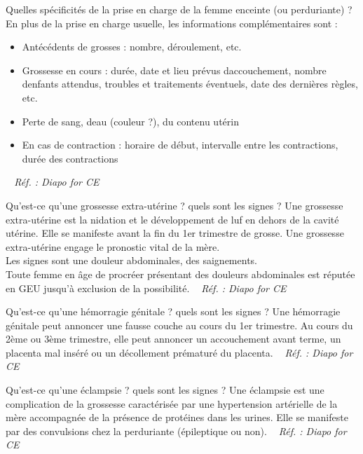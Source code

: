 \documentclass[grid,avery5371,landscape]{flashcards}
\makeatletter
\newcounter{nocarte}
\newcommand{\categ}[1]{%
  \def\@categ{#1}%
  \setcounter{nocarte}{0}%
}
\newcommand{\source}[1]{%
  \medskip
  \itshape%
   ~ \hfill Réf. : #1}
\makeatother
\begin{document}
\color[HTML]{01DF01}
\categ{CE-CP-REG}
\begin{flashcard}[CAT]{
 Quelles spécificités de la prise en charge de la femme enceinte (ou perduriante) ?   }
  En plus de la prise en charge usuelle, les informations complémentaires sont :
    \begin{itemize}
        \item Antécédents de grosses : nombre, déroulement, etc.
        \item Grossesse en cours : durée, date et lieu prévus daccouchement, nombre denfants attendus, troubles et traitements éventuels, date des dernières règles, etc.
        \item Perte de sang, deau (couleur ?), du contenu utérin
        \item En cas de contraction : horaire de début, intervalle entre les contractions, durée des contractions
    \end{itemize}
  \source{Diapo for CE }
\end{flashcard}


\color[HTML]{01DF01}
\categ{CE-CP-REG}
\begin{flashcard}[bilan]{
 Qu'est-ce qu'une grossesse extra-utérine ? quels sont les signes ?   }
  Une grossesse extra-utérine est la nidation et le développement de luf en dehors de la cavité utérine. Elle se manifeste avant la fin du 1er trimestre de grosse. Une grossesse extra-utérine engage le pronostic vital de la mère. \\
    Les signes sont une douleur abdominales, des saignements. \\
    Toute femme en âge de procréer présentant des douleurs abdominales est réputée en GEU jusqu'à exclusion de la possibilité.
  \source{Diapo for CE }
\end{flashcard}


\color[HTML]{01DF01}
\categ{CE-CP-REG}
\begin{flashcard}[bilan]{
 Qu'est-ce qu'une hémorragie génitale ? quels sont les signes ?   }
  Une hémorragie génitale peut annoncer une fausse couche au cours du 1er trimestre. Au cours du 2ème ou 3ème trimestre, elle peut annoncer un accouchement avant terme, un placenta mal inséré ou un décollement prématuré du placenta.
  \source{Diapo for CE }
\end{flashcard}


\color[HTML]{01DF01}
\categ{CE-CP-REG}
\begin{flashcard}[bilan]{
 Qu'est-ce qu'une éclampsie ? quels sont les signes ?   }
  Une éclampsie est une complication de la grossesse caractérisée par une hypertension artérielle de la mère accompagnée de la présence de protéines dans les urines. Elle se manifeste par des convulsions chez la perduriante (épileptique ou non).
  \source{Diapo for CE }
\end{flashcard}
\end{document}
